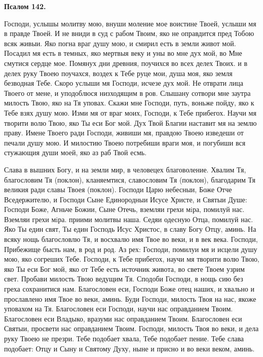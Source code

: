 \medskip


\bfseries Псалом 142.\normalfont{}\nopagebreak


Господи, услышы молитву мою, внуши моление мое воистине Твоей, услыши мя в правде Твоей. И не вниди в суд с рабом Твоим, яко не оправдится пред Тобою всяк живыи. Яко погна враг душу мою, и смирил есть в земли живот мой. Посадил мя есть в темных, яко мертвыя веку и уны во мне дух мой, во Мне смутися сердце мое. Помянух дни древния, поучихся во всех делех Твоих. и в делех руку Твоею поучахся, воздех к Тебе руце мои, душа моя, яко земля безводная Тебе. Скоро услыши мя Господи, исчезе дух мой. Не отврати лица Твоего от мене, и уподоблюся низходящим в ров. Слышану сотвори мне заутра милость Твою, яко на Тя уповах. Скажи мне Господи, путь, воньже пойду, яко к Тебе взях душу мою. Изми мя от враг моих, Господи, к Тебе прибегох. Научи мя творити волю Твою, яко Ты еси Бог мой. Дух Твой Благии наставит мя на землю праву. Имене Твоего ради Господи, живиши мя, правдою Твоею изведеши от печали душу мою. И милостию Твоею потребиши враги моя, и погубиши вся стужающия души моей, яко аз раб Твой есмь.


Слава в вышних Богу, и на земли мир, в человецех благоволение. Хвалим Тя, благословим Тя (поклон), кланяемтися, славословим Тя (поклон), благодарим Тя великия ради славы Твоея (поклон). Господи Царю небесныи, Боже Отче Вседержителю, и Господи Сыне Единородныи Исусе Христе, и Святыи Душе: Господи Боже, Агньче Божии, Сыне Отечь, вземляи грехи мiра, помилуй нас. Вземляи грехи мiра. приими молитвы наша. Седяи одесную Отца, помилуй нас. Яко Ты един свят, Ты един Господь Исус Христос, в славу Богу Отцу, аминь. На всяку нощь благословлю Тя, и восхвалю имя Твое во веки, и в век века. Господи, Прибежище бысть нам, в род и род. Аз рех: Господи, помилуи мя и исцели душу мою, яко согреших Тебе. Господи, к Тебе прибегох, научи мя творити волю Твою, яко Ты еси Бог мой, яко от Тебе есть источник живота, во свете Твоем узрим свет. Пробави милость Твою ведущим Тя. Сподоби Господи, в нощь сию без греха сохранитися нам. Благословен еси, Господи Боже отец наших, и хвально и прославлено имя Твое во веки,  аминь. Буди Господи, милость Твоя на нас, якоже уповахом на Тя. Благословен еси Господи, научи нас оправданием Твоим. Благословен еси Владыко, вразуми нас оправданием Твоим. Благословен еси Святыи, просвети нас оправданием Твоим. Господи, милость Твоя во веки, и дела руку Твоею не презри. Тебе подобает хвала, Тебе подобает пение. Тебе слава подобает: Отцу и Сыну и Святому Духу, ныне и присно и во веки веком, аминь.

